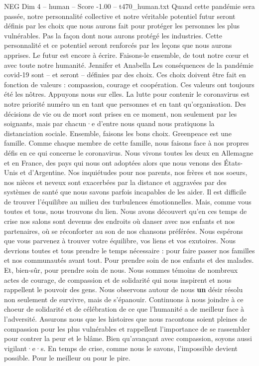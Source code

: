 \begin{textsample}{NEG Dim 4 – human – Score -1.00 – t470\_human.txt}
Quand cette pandémie sera passée, notre personnalité collective et notre véritable potentiel futur seront définis par les choix que nous aurons fait pour protéger les personnes les plus vulnérables.
Pas la façon dont nous aurons protégé les industries.
Cette personnalité et ce potentiel seront renforcés par les leçons que nous aurons apprises.
Le futur est encore à écrire.
Faisons-le ensemble, de tout notre cœur et avec toute notre humanité.
Jennifer et Anabella Les conséquences de la pandémie covid-19 sont – et seront – définies par des choix.
Ces choix doivent être fait en fonction de valeurs : compassion, courage et coopération.
Ces valeurs ont toujours été les nôtres.
Appuyons nous sur elles.
La lutte pour contenir le coronavirus est notre priorité numéro un en tant que personnes et en tant qu’organisation.
Des décisions de vie ou de mort sont prises en ce moment, non seulement par les soignants, mais par chacun·e d’entre nous quand nous pratiquons la distanciation sociale.
Ensemble, faisons les bons choix.
Greenpeace est une famille.
Comme chaque membre de cette famille, nous faisons face à nos propres défis en ce qui concerne le coronavirus.
Nous vivons toutes les deux en Allemagne et en France, des pays qui nous ont adoptées alors que nous venons des États-Unis et d’Argentine.
Nos inquiétudes pour nos parents, nos frères et nos soeurs, nos nièces et neveux sont exacerbées par la distance et aggravées par des systèmes de santé que nous savons parfois incapables de les aider.
Il est difficile de trouver l’équilibre au milieu des turbulences émotionnelles.
Mais, comme vous toutes et tous, nous trouvons du lien.
Nous avons découvert qu’en ces temps de crise nos salons sont devenus des endroits où danser avec nos enfants et nos partenaires, où se réconforter au son de nos chansons préférées.
Nous espérons que vous parvenez à trouver votre équilibre, vos liens et vos exutoires.
Nous devrions toutes et tous prendre le temps nécessaire : pour faire passer nos familles et nos communautés avant tout.
Pour prendre soin de nos enfants et des malades.
Et, bien-sûr, pour prendre soin de nous.
Nous sommes témoins de nombreux actes de courage, de compassion et de solidarité qui nous inspirent et nous rappellent le pouvoir des gens.
Nous observons autour de nous \textbf{un} désir résolu non seulement de survivre, mais de s’épanouir.
Continuons à nous joindre à ce choeur de solidarité et de célébration de ce que l’humanité a de meilleur face à l’adversité.
Assurons nous que les histoires que nous racontons soient pleines de compassion pour les plus vulnérables et rappellent l’importance de se rassembler pour contrer la peur et le blâme.
Bien qu’avançant avec compassion, soyons aussi vigilant·e·s.
En temps de crise, comme nous le savons, l’impossible devient possible.
Pour le meilleur ou pour le pire.

\end{textsample}
